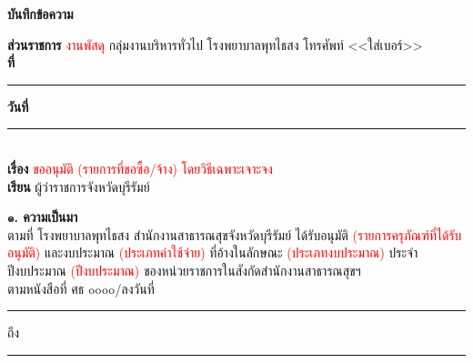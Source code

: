 \documentclass[12pt]{article}
\begin{document}

\noindent
\begin{minipage}[t]{0.99\textwidth}
    \hfill
\end{minipage}

\vspace{1.5em}
\begin{center}
    {\bfseries\LARGE บันทึกข้อความ}
\end{center}

\noindent
\textbf{ส่วนราชการ} \textcolor{red}{งานพัสดุ} กลุ่มงานบริหารทั่วไป โรงพยาบาลพุทไธสง โทรศัพท์ <<ใส่เบอร์>> \\
\textbf{ที่} \rule{3cm}{0.4pt} \hspace{1cm} \textbf{วันที่} \rule{3cm}{0.4pt} \\
\textbf{เรื่อง} \textcolor{red}{ขออนุมัติ (รายการที่ขอซื้อ/จ้าง) โดยวิธีเฉพาะเจาะจง} \\
\textbf{เรียน} ผู้ว่าราชการจังหวัดบุรีรัมย์

\vspace{0.5em}

\textbf{๑. ความเป็นมา} \\
ตามที่ โรงพยาบาลพุทไธสง สำนักงานสาธารณสุขจังหวัดบุรีรัมย์ ได้รับอนุมัติ \textcolor{red}{(รายการครุภัณฑ์ที่ได้รับอนุมัติ)} และงบประมาณ \textcolor{red}{(ประเภทค่าใช้จ่าย)} ที่อ้างในลักษณะ \textcolor{red}{(ประเภทงบประมาณ)} ประจำปีงบประมาณ \textcolor{red}{(ปีงบประมาณ)} ของหน่วยราชการในสังกัดสำนักงานสาธารณสุขฯ \\ 
ตามหนังสือที่ ศธ ๐๐๐๐/ลงวันที่ \rule{2.5cm}{0.4pt} ถึง \rule{2.5cm}{0.4pt}

\vspace{0.5em}
\end{document}
